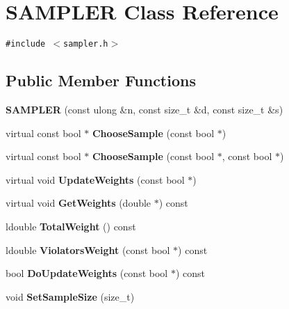 \section{SAMPLER Class Reference}
\label{classSAMPLER}
{\tt \#include $<$sampler.h$>$}

\subsection*{Public Member Functions}
\begin{CompactItemize}
\item 
\textbf{SAMPLER} (const ulong \&n, const size\_\-t \&d, const size\_\-t \&s)\label{classSAMPLER_d757e2d2ad76d516350d5f845600c191}

\item 
virtual const bool $\ast$ \textbf{ChooseSample} (const bool $\ast$)\label{classSAMPLER_e8fa741e4ba8587f9eb10cdca6799794}

\item 
virtual const bool $\ast$ \textbf{ChooseSample} (const bool $\ast$, const bool $\ast$)\label{classSAMPLER_88b4eb45319d006fb7c4f71a809094e5}

\item 
virtual void \textbf{UpdateWeights} (const bool $\ast$)\label{classSAMPLER_5a066988db0f52726fd0c3bf36b45159}

\item 
virtual void \textbf{GetWeights} (double $\ast$) const\label{classSAMPLER_bcd11490bd14a8ce5bae95783fb731f8}

\item 
ldouble \textbf{TotalWeight} () const\label{classSAMPLER_661ae82fdefecf638c8adb0c95695488}

\item 
ldouble \textbf{ViolatorsWeight} (const bool $\ast$) const \label{classSAMPLER_fe9aff53f151a781b7b608af59e8c5c8}

\item 
bool \textbf{DoUpdateWeights} (const bool $\ast$) const \label{classSAMPLER_185e9ee6815665e4a43f05290485b130}

\item 
void \textbf{SetSampleSize} (size\_\-t)\label{classSAMPLER_147b3e9eb27bfe27d7eceb504c6c249b}

\end{CompactItemize}
